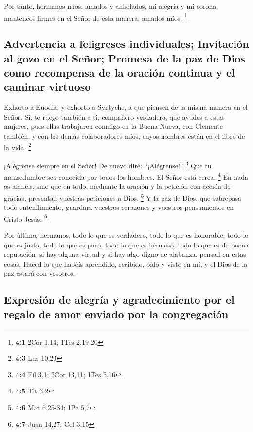 \begin{paracol}{2}
 Por tanto, hermanos míos, amados y anhelados, mi alegría
y mi corona, manteneos firmes en el Señor de esta manera, amados míos.
\footnote{\textbf{4:1} 2Cor 1,14; 1Tes 2,19-20}

\hypertarget{advertencia-a-feligreses-individuales-invitaciuxf3n-al-gozo-en-el-seuxf1or-promesa-de-la-paz-de-dios-como-recompensa-de-la-oraciuxf3n-continua-y-el-caminar-virtuoso}{%
\subsection{Advertencia a feligreses individuales; Invitación al gozo en
el Señor; Promesa de la paz de Dios como recompensa de la oración
continua y el caminar
virtuoso}\label{advertencia-a-feligreses-individuales-invitaciuxf3n-al-gozo-en-el-seuxf1or-promesa-de-la-paz-de-dios-como-recompensa-de-la-oraciuxf3n-continua-y-el-caminar-virtuoso}}

 Exhorto a Euodia, y exhorto a Syntyche, a que piensen de
la misma manera en el Señor.  Sí, te ruego también a ti,
compañero verdadero, que ayudes a estas mujeres, pues ellas trabajaron
conmigo en la Buena Nueva, con Clemente también, y con los demás
colaboradores míos, cuyos nombres están en el libro de la vida.
\footnote{\textbf{4:3} Luc 10,20}

 ¡Alégrense siempre en el Señor! De nuevo diré:
``¡Alégrense!'' \footnote{\textbf{4:4} Fil 3,1; 2Cor 13,11; 1Tes 5,16}
 Que tu mansedumbre sea conocida por todos los hombres. El
Señor está cerca. \footnote{\textbf{4:5} Tit 3,2}  En nada
os afanéis, sino que en todo, mediante la oración y la petición con
acción de gracias, presentad vuestras peticiones a Dios. \footnote{\textbf{4:6}
  Mat 6,25-34; 1Pe 5,7}  Y la paz de Dios, que sobrepasa
todo entendimiento, guardará vuestros corazones y vuestros pensamientos
en Cristo Jesús. \footnote{\textbf{4:7} Juan 14,27; Col 3,15}

 Por último, hermanos, todo lo que es verdadero, todo lo
que es honorable, todo lo que es justo, todo lo que es puro, todo lo que
es hermoso, todo lo que es de buena reputación: si hay alguna virtud y
si hay algo digno de alabanza, pensad en estas cosas. 
Haced lo que habéis aprendido, recibido, oído y visto en mí, y el Dios
de la paz estará con vosotros.

\hypertarget{expresiuxf3n-de-alegruxeda-y-agradecimiento-por-el-regalo-de-amor-enviado-por-la-congregaciuxf3n}{%
\subsection{Expresión de alegría y agradecimiento por el regalo de amor
enviado por la
congregación}\label{expresiuxf3n-de-alegruxeda-y-agradecimiento-por-el-regalo-de-amor-enviado-por-la-congregaciuxf3n}}


\end{paracol}
